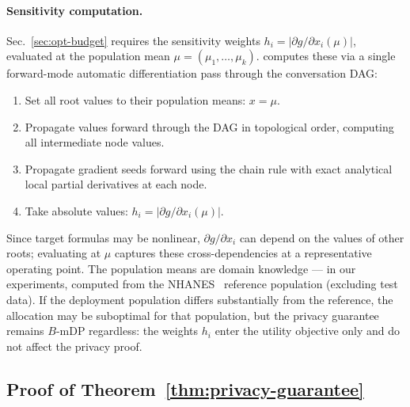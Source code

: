 \paragraph{Sensitivity computation.} Sec.~\ref{sec:opt-budget} requires the sensitivity weights $h_i = |\partial g / \partial x_i(\mu)|$, evaluated at the population mean $\mu = (\mu_1, \dots, \mu_k)$. \sysname{} computes these via a single forward-mode automatic differentiation pass through the conversation DAG:
\begin{enumerate}
    \item Set all root values to their population means: $x = \mu$.
    \item Propagate values forward through the DAG in topological order, computing all intermediate node values.
    \item Propagate gradient seeds forward using the chain rule with exact analytical local partial derivatives at each node.
    \item Take absolute values: $h_i = |\partial g / \partial x_i(\mu)|$.
\end{enumerate}
Since target formulas may be nonlinear, $\partial g / \partial x_i$ can depend on the values of other roots; evaluating at $\mu$ captures these cross-dependencies at a representative operating point. The population means are domain knowledge --- in our experiments, computed from the NHANES~\cite{nhanes2017exam} reference population (excluding test data). If the deployment population differs substantially from the reference, the allocation may be suboptimal for that population, but the privacy guarantee remains $B$-mDP regardless: the weights $h_i$ enter the utility objective only and do not affect the privacy proof.

\subsection{Proof of Theorem~\ref{thm:privacy-guarantee}}
\label{app:thm:privacy-guarantee}

